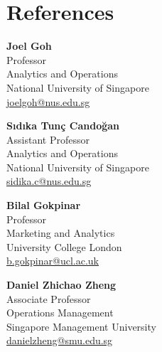 \documentclass[12pt, a4paper]{article}
\begin{document}
{%
\section*{References}
\hspace*{12pt}
\begin{minipage}{0.45\textwidth}
	\textbf{Joel Goh} \\
	Professor\\
	Analytics and Operations \\
	National University of Singapore \\
	\href{mailto:joelgoh@nus.edu.sg}{joelgoh@nus.edu.sg}
\end{minipage}
\hfill
\begin{minipage}{0.45\textwidth}
	\textbf{S{\i}d{\i}ka Tun\c{c} Cando\u{g}an} \\
	Assistant Professor\\
	Analytics and Operations \\
	National University of Singapore \\
	\href{mailto:sidika.c@nus.edu.sg}{sidika.c@nus.edu.sg}
\end{minipage}

\vspace*{12pt}
\hspace*{12pt}
\begin{minipage}{0.45\textwidth}
	\textbf{Bilal Gokpinar} \\
	Professor\\
	Marketing and Analytics \\
	University College London \\
	\href{mailto:b.gokpinar@ucl.ac.uk}{b.gokpinar@ucl.ac.uk}
\end{minipage}
\hfill
\begin{minipage}{0.45\textwidth}
	\textbf{Daniel Zhichao Zheng} \\
	Associate Professor\\
	Operations Management \\
	Singapore Management University \\
	\href{mailto:danielzheng@smu.edu.sg}{danielzheng@smu.edu.sg}
\end{minipage}

}
\end{document}

